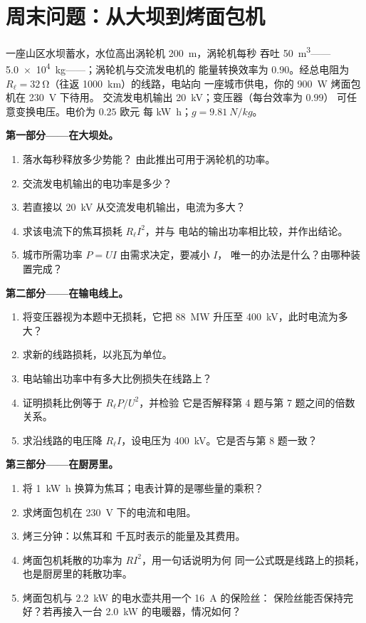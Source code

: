 \section{周末问题：从大坝到烤面包机}

\begin{problem}
\label{pb:g11:circuits-and-power:1}
一座山区水坝蓄水，水位高出涡轮机 \qty{200}{m}，涡轮机每秒
吞吐 \qty{50}{m^3}——\qty{5.0e4}{kg}——；涡轮机与交流发电机的
能量转换效率为 $0.90$。经总电阻为
$R_\ell = \qty{32}{\ohm}$（往返 \qty{1000}{km}）的线路，电站向
一座城市供电，你的 \qty{900}{W} 烤面包机在 \qty{230}{V} 下待用。
交流发电机输出 \qty{20}{kV}；变压器（每台效率为 $0.99$）
可任意变换电压。电价为 $0.25$ 欧元
每 \unit{kW.h}；$g = \qty{9.81}{N/kg}$。

\medskip
\noindent\textbf{第一部分——在大坝处。}
\begin{enumerate}
  \item 落水每秒释放多少势能？
        由此推出可用于涡轮机的功率。
  \item 交流发电机输出的电功率是多少？
  \item 若直接以 \qty{20}{kV} 从交流发电机输出，电流为多大？
  \item 求该电流下的焦耳损耗 $R_\ell I^2$，并与
        电站的输出功率相比较，并作出结论。
  \item 城市所需功率 $P = UI$ 由需求决定，要减小 $I$，
        唯一的办法是什么？由哪种装置完成？
\end{enumerate}

\medskip
\noindent\textbf{第二部分——在输电线上。}
\begin{enumerate}[resume]
  \item 将变压器视为本题中无损耗，它把
        \qty{88}{MW} 升压至 \qty{400}{kV}，此时电流为多大？
  \item 求新的线路损耗，以兆瓦为单位。
  \item 电站输出功率中有多大比例损失在线路上？
  \item 证明损耗比例等于 $R_\ell P/U^2$，并检验
        它是否解释第 4 题与第 7 题之间的倍数关系。
  \item 求沿线路的电压降 $R_\ell I$，设电压为
        \qty{400}{kV}。它是否与第 8 题一致？
\end{enumerate}

\medskip
\noindent\textbf{第三部分——在厨房里。}
\begin{enumerate}[resume]
  \item 将 \qty{1}{kW.h} 换算为焦耳；电表计算的是哪些量的乘积？
  \item 求烤面包机在 \qty{230}{V} 下的电流和电阻。
  \item 烤三分钟：以焦耳和
        千瓦时表示的能量及其费用。
  \item 烤面包机耗散的功率为 $RI^2$，用一句话说明为何
        同一公式既是线路上的损耗，也是厨房里的耗散功率。
  \item 烤面包机与 \qty{2.2}{kW} 的电水壶共用一个 \qty{16}{A} 的保险丝：
        保险丝能否保持完好？若再接入一台 \qty{2.0}{kW} 的电暖器，情况如何？
\end{enumerate}


\end{problem}

